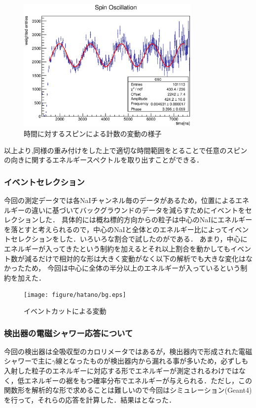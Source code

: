 \begin{figure}[bht]
  \centering
  \includegraphics[width=0.8\textwidth]{figure/hatano/oscillation.eps}
  \caption{時間に対するスピンによる計数の変動の様子}
  \label{hatano_fig:oscillation}
\end{figure}

以上より,同様の重み付けをした上で適切な時間範囲をとることで任意のスピンの向きに関するエネルギースペクトルを取り出すことができる．

\subsubsection{イベントセレクション}
今回の測定データでは各NaIチャンネル毎のデータがあるため，位置によるエネルギーの違いに基づいてバックグラウンドのデータを減らすためにイベントをセレクションした．
具体的には概ね標的方向からの粒子は中心のNaIにエネルギーを落とすと考えられるので，中心のNaIと全体とのエネルギー比によってイベントセレクションをした．いろいろな割合で試したのがである．
あまり，中心にエネルギーが入ってきたという制約を加えるとそれ以上割合を動かしてもイベント数が減るだけで相対的な形は大きく変動がなく以下の解析でも大きな変化はなかったため，
今回は中心に全体の半分以上のエネルギーが入っているという制約を加えた．

\begin{figure}[bht]
  \centering
  \texttt{[image: figure/hatano/bg.eps]}
  \caption{イベントカットによる変動}
  \label{hatano_fig:bg}
\end{figure}

\subsubsection{検出器の電磁シャワー応答について}
今回の検出器は全吸収型のカロリメータではあるが，検出器内で形成された電磁シャワーで主に$\gamma$線となったものが検出器内から漏れる事が多いため，必ずしも入射した粒子のエネルギーに対応する形でエネルギーが測定されるわけではなく，低エネルギーの裾をもつ確率分布でエネルギーが与えられる．ただし，この関数形を解析的な形で求めることは難しいので今回はシミュレーション(Geant4)を行って，それらの応答を計算した．結果はとなった．

